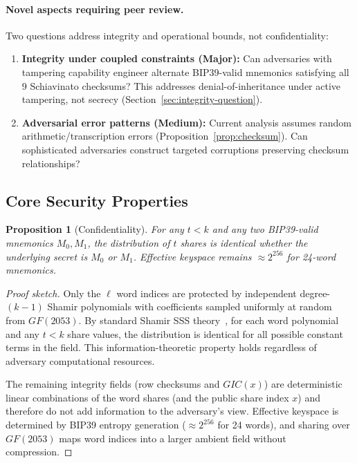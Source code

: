 \documentclass[11pt]{article}
\newtheorem{proposition}{Proposition}[section]
\begin{document}
\paragraph{Novel aspects requiring peer review.} Two questions address integrity and operational bounds, not confidentiality:

\begin{enumerate}[noitemsep]
    \item \textbf{Integrity under coupled constraints (Major):} Can adversaries with tampering capability engineer alternate BIP39-valid mnemonics satisfying all 9 Schiavinato checksums? This addresses denial-of-inheritance under active tampering, not secrecy (Section~\ref{sec:integrity-question}).
    
    \item \textbf{Adversarial error patterns (Medium):} Current analysis assumes random arithmetic/transcription errors (Proposition~\ref{prop:checksum}). Can sophisticated adversaries construct targeted corruptions preserving checksum relationships?
\end{enumerate}

\subsection{Core Security Properties}

\begin{proposition}[Confidentiality]
\label{prop:confidentiality}
For any $t < k$ and any two BIP39-valid mnemonics $M_0, M_1$, the distribution of $t$ shares is identical whether the underlying secret is $M_0$ or $M_1$. Effective keyspace remains $\approx 2^{256}$ for 24-word mnemonics.
\end{proposition}

\begin{proof}[Proof sketch]
Only the $\ell$ word indices are protected by independent degree-$(k-1)$ Shamir polynomials with coefficients sampled uniformly at random from $GF(2053)$. By standard Shamir SSS theory~\cite{shamir1979}, for each word polynomial and any $t < k$ share values, the distribution is identical for all possible constant terms in the field. This information-theoretic property holds regardless of adversary computational resources.

The remaining integrity fields (row checksums and $GIC(x)$) are deterministic linear combinations of the word shares (and the public share index $x$) and therefore do not add information to the adversary's view. Effective keyspace is determined by BIP39 entropy generation ($\approx 2^{256}$ for 24 words), and sharing over $GF(2053)$ maps word indices into a larger ambient field without compression.
\end{proof}
\end{document}
